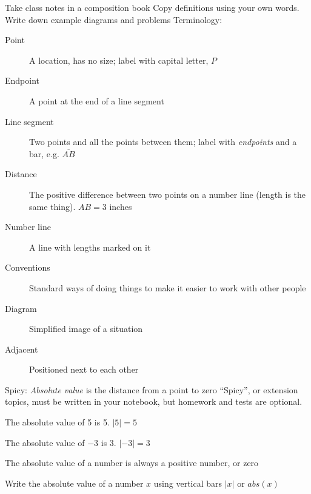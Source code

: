 \begin{frame}{Take class notes in a composition book}
  {Copy definitions using your own words. Write down example diagrams and problems}
  Terminology:
    \begin{description}
      \item[Point] A location, has no size; label with capital letter, $P$
      \item[Endpoint] A point at the end of a line segment
      \item[Line segment] Two points and all the points between them; label with \emph{endpoints} and a bar, e.g. $\overline{AB}$
      \item[Distance] The positive difference between two points on a number line (length is the same thing). $AB=3$ inches
      \item[Number line] A line with lengths marked on it
      \item[Conventions] Standard ways of doing things to make it easier to work with other people
      \item[Diagram] Simplified image of a situation
      \item[Adjacent] Positioned next to each other
    \end{description}
  \end{frame}

\begin{frame}{Spicy: \emph{Absolute value} is the distance from a point to zero}
  {``Spicy'', or extension topics, must be written in your notebook, but homework and tests are optional.}
     \par \bigskip
    The absolute value of 5 is 5. $|5|=5$ \par \bigskip
    The absolute value of $-3$ is 3. $|-3|=3$ \par \bigskip
    The absolute value of a number is always a positive number, or zero  \par \smallskip
    Write the absolute value of a number $x$ using vertical bars $|x|$ or $abs(x)$
  \end{frame}

